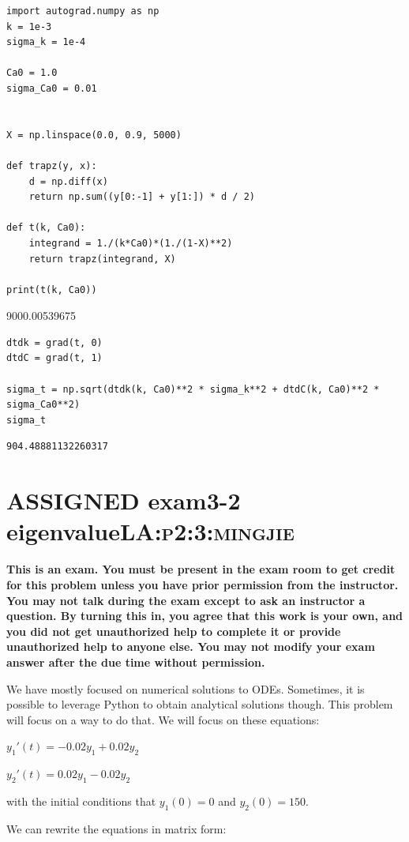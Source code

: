\documentclass[11pt]{article}
\begin{document}
\begin{verbatim}
import autograd.numpy as np
k = 1e-3
sigma_k = 1e-4

Ca0 = 1.0
sigma_Ca0 = 0.01


X = np.linspace(0.0, 0.9, 5000)

def trapz(y, x):
    d = np.diff(x)
    return np.sum((y[0:-1] + y[1:]) * d / 2)

def t(k, Ca0):
    integrand = 1./(k*Ca0)*(1./(1-X)**2)
    return trapz(integrand, X)

print(t(k, Ca0))
\end{verbatim}

9000.00539675

\begin{verbatim}
dtdk = grad(t, 0)
dtdC = grad(t, 1)

sigma_t = np.sqrt(dtdk(k, Ca0)**2 * sigma_k**2 + dtdC(k, Ca0)**2 * sigma_Ca0**2)
sigma_t
\end{verbatim}

\begin{verbatim}
904.48881132260317
\end{verbatim}


\section{{\bfseries\sffamily ASSIGNED} exam3-2 eigenvalue\hfill{}\textsc{LA:p2:3:mingjie}}
\label{sec:org2f31744}
\textbf{This is an exam. You must be present in the exam room to get credit for this problem unless you have prior permission from the instructor. You may not talk during the exam except to ask an instructor a question. By turning this in, you agree that this work is your own, and you did not get unauthorized help to complete it or provide unauthorized help to anyone else. You may not modify your exam answer after the due time without permission.}

We have mostly focused on numerical solutions to ODEs. Sometimes, it is possible to leverage Python to obtain analytical solutions though. This problem will focus on a way to do that. We will focus on these equations:

\(y_1'(t) = -0.02 y_1 + 0.02 y_2\)

\(y_2'(t) = 0.02 y_1 - 0.02 y_2\)

with the initial conditions that \(y_1(0) = 0\) and \(y_2(0) = 150\).

We can rewrite the equations in matrix form:
\end{document}
